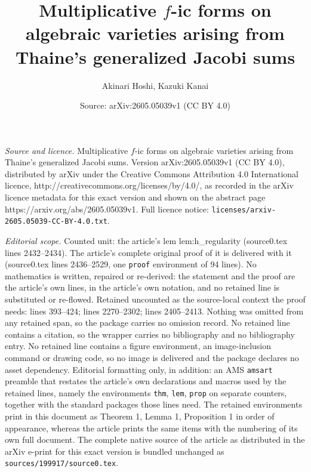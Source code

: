 \documentclass[10pt,a4paper]{amsart}
\title{Multiplicative $f$-ic forms on algebraic varieties arising from Thaine's generalized Jacobi sums}
\author{Akinari Hoshi, Kazuki Kanai}
\date{Source: arXiv:2605.05039v1 (CC BY 4.0)}
\begin{document}
\maketitle

\noindent\emph{Source and licence.} Multiplicative $f$-ic forms on algebraic varieties arising from Thaine's generalized Jacobi sums. Version arXiv:2605.05039v1 (CC BY 4.0), distributed by arXiv under the Creative Commons Attribution 4.0 International licence, http://creativecommons.org/licenses/by/4.0/, as recorded in the arXiv licence metadata for this exact version and shown on the abstract page https://arxiv.org/abs/2605.05039v1. Full licence notice: \texttt{licenses/arxiv-2605.05039-CC-BY-4.0.txt}.\par\smallskip

\noindent\textit{Editorial scope.} Counted unit: the article's lem lem:h\_regularity (source0.tex lines 2432--2434). The article's complete original proof of it is delivered with it (source0.tex lines 2436--2529, one \texttt{proof} environment of 94 lines). No mathematics is written, repaired or re-derived: the statement and the proof are the article's own lines, in the article's own notation, and no retained line is substituted or re-flowed.  Retained uncounted as the source-local context the proof needs: lines 393--424; lines 2270--2302; lines 2405--2413.  Nothing was omitted from any retained span, so the package carries no omission record.  No retained line contains a citation, so the wrapper carries no bibliography and no bibliography entry.  No retained line contains a figure environment, an image-inclusion command or drawing code, so no image is delivered and the package declares no asset dependency.  Editorial formatting only, in addition: an AMS \texttt{amsart} preamble that restates the article's own declarations and macros used by the retained lines, namely the environments \texttt{thm}, \texttt{lem}, \texttt{prop} on separate counters, together with the standard packages those lines need.  The retained environments print in this document as Theorem 1, Lemma 1, Proposition 1 in order of appearance, whereas the article prints the same items with the numbering of its own full document.  The complete native source of the article as distributed in the arXiv e-print for this exact version is bundled unchanged as \texttt{sources/199917/source0.tex}.
\end{document}
